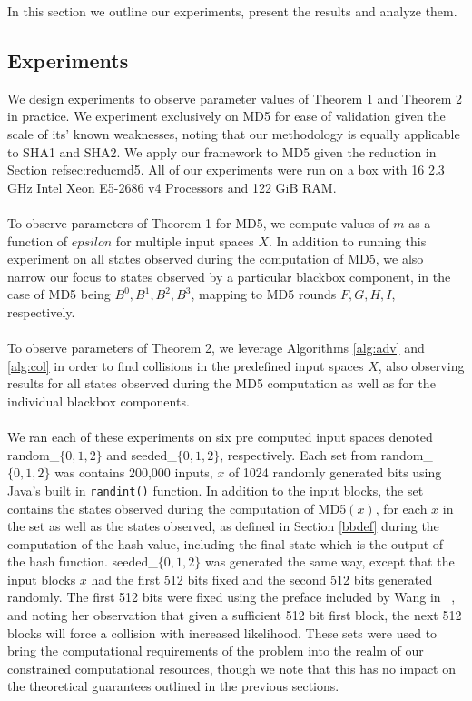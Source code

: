 \documentclass[letterpaper,twocolumn,10pt]{article}
\begin{document}
In this section we outline our experiments, present the results and analyze them. 

\subsection{Experiments} 
We design experiments to observe parameter values of Theorem 1 and Theorem 2 in practice. We experiment exclusively on MD5 for ease of validation given the scale of its' known weaknesses, noting that our methodology is equally applicable to SHA1 and SHA2. We apply our framework to MD5 given the reduction in Section {refsec:reducmd5}. All of our experiments were run on a box with 16 2.3 GHz Intel Xeon E5-2686 v4 Processors and 122 GiB RAM.
\\
\\
To observe parameters of Theorem 1 for MD5, we compute values of $m$ as a function of $epsilon$ for multiple input spaces $X$. In addition to running this experiment on all states observed during the computation of MD5, we also narrow our focus to states observed by a particular blackbox component, in the case of MD5 being $B^0, B^1, B^2, B^3$, mapping to MD5 rounds $F, G, H, I$, respectively. 
\\
\\
To observe parameters of Theorem 2, we leverage Algorithms \ref{alg:adv} and \ref{alg:col} in order to find collisions in the predefined input spaces $X$, also observing results for all states observed during the MD5 computation as well as for the individual blackbox components. 
\\
\\
We ran each of these experiments on six pre computed input spaces denoted random\_$\{0,1,2\}$ and seeded\_$\{0,1,2\}$, respectively. Each set from random\_$\{0,1,2\}$ was contains 200,000 inputs, $x$ of 1024 randomly generated bits using Java's built in \texttt{randint()} function. In addition to the input blocks, the set contains the states observed during the computation of MD5$(x)$, for each $x$ in the set as well as the states observed, as defined in Section \ref{bbdef} during the computation of the hash value, including the final state which is the output of the hash function. seeded\_$\{0,1,2\}$ was generated the same way, except that the input blocks $x$ had the first 512 bits fixed and the second 512 bits generated randomly. The first 512 bits were fixed using the preface included by Wang in ~\cite{wang2005break}, and noting her observation that given a sufficient 512 bit first block, the next 512 blocks will force a collision with increased likelihood. These sets were used to bring the computational requirements of the problem into the realm of our constrained computational resources, though we note that this has no impact on the theoretical guarantees outlined in the previous sections.  
\end{document}
